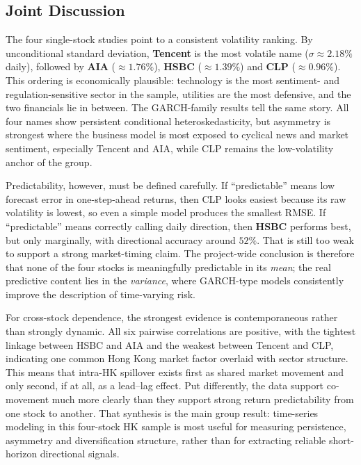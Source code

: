 \documentclass[11pt,a4paper]{article}
\begin{document}
\subsection{Joint Discussion}
\label{sec:compare-joint}
The four single-stock studies point to a consistent volatility ranking.
By unconditional standard deviation, \textbf{Tencent} is the most
volatile name ($\sigma \approx 2.18\%$ daily), followed by
\textbf{AIA} ($\approx 1.76\%$), \textbf{HSBC} ($\approx 1.39\%$) and
\textbf{CLP} ($\approx 0.96\%$).  This ordering is economically
plausible: technology is the most sentiment- and regulation-sensitive
sector in the sample, utilities are the most defensive, and the two
financials lie in between.  The GARCH-family results tell the same
story.  All four names show persistent conditional heteroskedasticity,
but asymmetry is strongest where the business model is most exposed to
cyclical news and market sentiment, especially Tencent and AIA, while
CLP remains the low-volatility anchor of the group.

Predictability, however, must be defined carefully.  If ``predictable''
means low forecast error in one-step-ahead returns, then CLP looks
easiest because its raw volatility is lowest, so even a simple model
produces the smallest RMSE.  If ``predictable'' means correctly calling
daily direction, then \textbf{HSBC} performs best, but only marginally,
with directional accuracy around $52\%$.  That is still too weak to
support a strong market-timing claim.  The project-wide conclusion is
therefore that none of the four stocks is meaningfully predictable in
its \emph{mean}; the real predictive content lies in the
\emph{variance}, where GARCH-type models consistently improve the
description of time-varying risk.

For cross-stock dependence, the strongest evidence is contemporaneous
rather than strongly dynamic.  All six pairwise correlations are
positive, with the tightest linkage between HSBC and AIA and the
weakest between Tencent and CLP, indicating one common Hong Kong market
factor overlaid with sector structure.  This means that intra-HK
spillover exists first as shared market movement and only second, if at
all, as a lead--lag effect.  Put differently, the data support
co-movement much more clearly than they support strong return
predictability from one stock to another.  That synthesis is the main
group result: time-series modeling in this four-stock HK sample is most
useful for measuring persistence, asymmetry and diversification
structure, rather than for extracting reliable short-horizon directional
signals.
\end{document}

